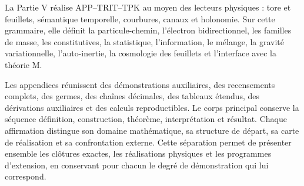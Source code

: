 La Partie V réalise APP--TRIT--TPK au moyen des lecteurs physiques : tore et feuillets,
sémantique temporelle, courbures, canaux et holonomie. Sur cette grammaire,
elle définit la particule-chemin, l'électron bidirectionnel, les familles de masse,
les constitutives, la statistique, l'information, le mélange, la gravité
variationnelle, l'auto-inertie, la cosmologie des feuillets et l'interface avec la théorie
M.

Les appendices réunissent des démonstrations auxiliaires, des recensements complets, des germes,
des chaînes décimales, des tableaux étendus, des dérivations auxiliaires et des calculs
reproductibles. Le corps principal conserve la séquence définition,
construction, théorème, interprétation et résultat. Chaque affirmation distingue
son domaine mathématique, sa structure de départ, sa carte de réalisation et sa
confrontation externe. Cette séparation permet de présenter ensemble les clôtures
exactes, les réalisations physiques et les programmes d'extension, en conservant
pour chacun le degré de démonstration qui lui correspond.
